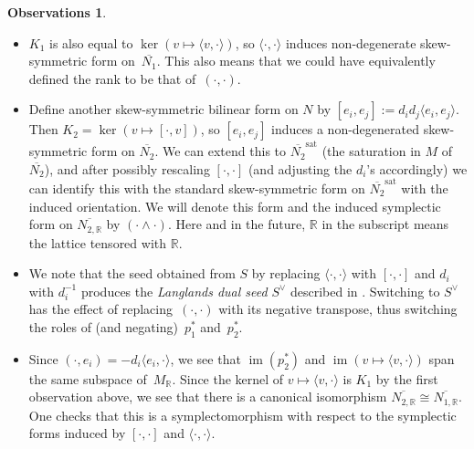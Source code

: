 \documentclass[10pt,a4paper]{amsart}
\numberwithin{equation}{section}
\numberwithin{figure}{section}
\numberwithin{table}{section}
\DeclareMathOperator{\im}{im}
\DeclareMathOperator{\sat}{sat}
\let\?=\overline
\let\bb=\mathbb
\theoremstyle{definition}
\newtheorem{obss}[thm]{Observations}
\begin{document}
\begin{obss}\label{Cluster Obs}\quad
\begin{itemize}\itemsep=0pt
\item $K_1$ is also equal to $\ker (v\mapsto \langle v,\cdot\rangle )$, so $\langle \cdot,\cdot\rangle$ induces non-degenerate skew-symmetric form on~$\?{N_1}$. This also means that we could have equivalently defined the rank to be that of~$(\cdot,\cdot)$.
\item Define another skew-symmetric bilinear form on $N$ by $[e_i,e_j]:=d_id_j\langle e_i,e_j \rangle$. Then $K_2=\ker\left(v\mapsto [ \cdot,v ] \right)$, so $[e_i,e_j]$ induces a non-degenerated skew-symmetric form on $\?{N_2}$. We can extend this to $\?{N_2}^{\sat}$ (the saturation in $M$ of $\?{N_2}$), and after possibly rescaling $[\cdot,\cdot]$ (and adjusting the $d_i$'s accordingly) we can identify this with the standard skew-symmetric form on $\?{N_2}^{\sat}$ with the induced orientation. We will denote this form and the induced symplectic form on $\?{N_{2,\bb{R}}}$ by $(\cdot\wedge \cdot)$. Here and in the future, $\bb{R}$ in the subscript means the lattice tensored with $\bb{R}$.
\item We note that the seed obtained from $S$ by replacing $\langle \cdot,\cdot\rangle$ with $[\cdot,\cdot]$ and $d_i$ with $d_i^{-1}$ produces the {\it Langlands dual seed} $S^{\vee}$ described in \cite{FG1}.
 Switching to $S^{\vee}$ has the effect of replacing~$(\cdot,\cdot)$ with its negative transpose, thus switching the roles of (and negating)~$p_1^*$ and~$p_2^*$.
\item Since $(\cdot, e_i) = -d_i\langle e_i,\cdot\rangle$, we see that $\im(p^*_2)$ and $\im(v\mapsto \langle v,\cdot\rangle)$ span the same subspace of~$M_{\bb{R}}$. Since the kernel of $v\mapsto \langle v,\cdot\rangle$ is $K_1$ by the first observation above, we see that there is a canonical isomorphism $\?{N_{2,\bb{R}}}\cong \?{N_{1,\bb{R}}}$. One checks that this is a symplectomorphism with respect to the symplectic forms induced by $[\cdot,\cdot]$ and $\langle \cdot,\cdot\rangle$.
\end{itemize}
\end{obss}
\end{document}
